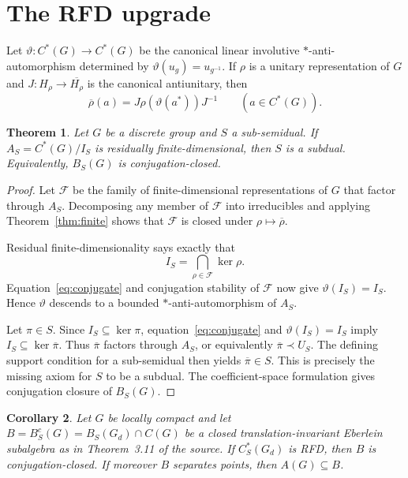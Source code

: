 \documentclass[11pt,a4paper]{article}
\newtheorem{theorem}{Theorem}
\newtheorem{corollary}[theorem]{Corollary}
\begin{document}
\section{The RFD upgrade}

Let $\vartheta:C^*(G)\to C^*(G)$ be the canonical linear involutive
$*$-anti-automorphism determined by
$\vartheta(u_g)=u_{g^{-1}}$.  If $\rho$ is a unitary representation of $G$ and
$J:H_\rho\to\overline{H_\rho}$ is the canonical antiunitary, then
\begin{equation}\label{eq:conjugate}
 \overline\rho(a)=J\rho\!\left(\vartheta(a^*)\right)J^{-1}
 \qquad(a\in C^*(G)).
\end{equation}

\begin{theorem}\label{thm:rfd}
Let $G$ be a discrete group and $S$ a sub-semidual.  If
$A_S=C^*(G)/I_S$ is residually finite-dimensional, then $S$ is a subdual.
Equivalently, $B_S(G)$ is conjugation-closed.
\end{theorem}

\begin{proof}
Let $\mathcal F$ be the family of finite-dimensional representations of $G$
that factor through $A_S$.  Decomposing any member of $\mathcal F$ into
irreducibles and applying Theorem~\ref{thm:finite} shows that $\mathcal F$ is
closed under $\rho\mapsto\overline\rho$.

Residual finite-dimensionality says exactly that
\[
 I_S=\bigcap_{\rho\in\mathcal F}\ker\rho.
\]
Equation~\eqref{eq:conjugate} and conjugation stability of $\mathcal F$ now give
$\vartheta(I_S)=I_S$.  Hence $\vartheta$ descends to a bounded
$*$-anti-automorphism of $A_S$.

Let $\pi\in S$.  Since $I_S\subseteq\ker\pi$, equation~\eqref{eq:conjugate}
and $\vartheta(I_S)=I_S$ imply $I_S\subseteq\ker\overline\pi$.  Thus
$\overline\pi$ factors through $A_S$, or equivalently
$\overline\pi\prec U_S$.  The defining support condition for a sub-semidual
then yields $\overline\pi\in S$.  This is precisely the missing axiom for $S$
to be a subdual.  The coefficient-space formulation gives conjugation closure
of $B_S(G)$.
\end{proof}

\begin{corollary}\label{cor:local}
Let $G$ be locally compact and let
$B=B_S^c(G)=B_S(G_d)\cap C(G)$ be a closed translation-invariant Eberlein
subalgebra as in Theorem~3.11 of the source.  If $C_S^*(G_d)$ is RFD, then $B$
is conjugation-closed.  If moreover $B$ separates points, then
$A(G)\subseteq B$.
\end{corollary}
\end{document}
